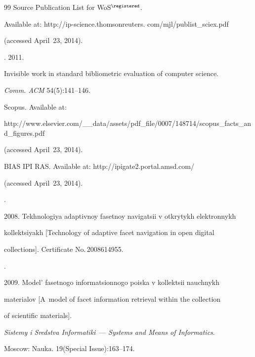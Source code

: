 {{\begin{thebibliography}{99}
Source Publication List for WoS$^\registered$.


Available at: {\sf http://ip-science.thomsonreuters. com/mjl/publist\_sciex.pdf}


(accessed April~23, 2014).




. 2011.


Invisible work in standard bibliometric evaluation of  computer science.


\textit{Comm. ACM} 54(5):141--146.




Scopus. Available at:


{\sf http://www.elsevier.com/\_\_data/assets/pdf\_file/0007/148714/\linebreak scopus\_facts\_and\_figures.pdf}


(accessed April~23, 2014).




BIAS IPI RAS.  Available at:   {\sf http://ipigate2.portal.amsd.com/}


(accessed April~23, 2014).




.


2008.  Tekhnologiya adaptivnoy fasetnoy navigatsii v otkrytykh elektronnykh


kollektsiyakh  [Technology of adaptive facet navigation in open digital


collections]. Certificate No.\,2008614955.




.


2009.   Model' fasetnogo informatsionnogo poiska  v kollektsii nauchnykh


materialov [A~model of facet information retrieval within the collection


of scientific materials].


\textit{Sistemy i Sredstva Informatiki}~--- \textit{Systems and Means of Informatics}.


Moscow: Nauka. 19(Special Issue):163--174.


\end{thebibliography}


} }





